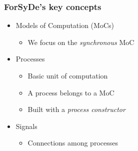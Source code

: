         \begin{frame}
            \frametitle{ForSyDe's key concepts}

            \begin{itemize}
                \item Models of Computation (MoCs)
                    \begin{itemize}
                        \item We focus on the \emph{synchronous} MoC
                    \end{itemize}
                \item Processes
                    \begin{itemize}
                        \item Basic unit of computation
                        \item A process belongs to a MoC
                        \item Built with a \emph{process constructor}
                    \end{itemize}
                \item Signals
                    \begin{itemize}
                        \item Connections among processes
                    \end{itemize}
            \end{itemize}

        \end{frame}

